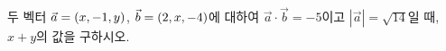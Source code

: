 두 벡터 $\vec{a}=(x{,}\mkern3mu\mathopen{}-1{,}\mkern3mu\mathopen{}y)$, $\vec{b}=(2{,}\mkern3mu\mathopen{}x{,}\mkern3mu\mathopen{}-4)$에 대하여 $\vec{a}\cdot\vec{b}=-5$이고 $|\vec{a}|=\sqrt{14}$일 때, $x+y$의 값을 구하시오. 
